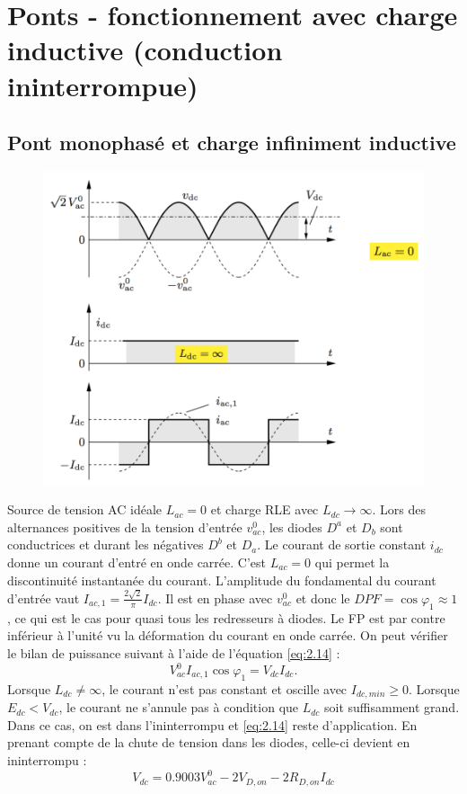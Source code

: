\section{Ponts - fonctionnement avec charge inductive (conduction ininterrompue)}
	\subsection{Pont monophasé et charge infiniment inductive}
		\begin{figure}
		\vspace{-5mm}
		\includegraphics[scale=0.3]{ch2/10}
		\end{figure} 
		Source de tension AC idéale $L_{ac} = 0$ et charge RLE avec $L_{dc}\rightarrow \infty$. Lors des alternances positives de la tension d'entrée $v_{ac}^0$, les diodes $D^a$ et $D_b$ sont conductrices et durant les négatives $D^b$ et $D_a$. Le courant de sortie constant $i_{dc}$ donne un courant d'entré en onde carrée. C'est $L_{ac} = 0$ qui permet la discontinuité instantanée du courant. L'amplitude du fondamental du courant d'entrée vaut $I_{ac,1} = \frac{2\sqrt{2}}{\pi} I_{dc}$. Il est en phase avec $v_{ac}^0$ et donc le $DPF = \cos \varphi _1 \approx 1$, ce qui est le cas pour quasi tous les redresseurs à diodes. Le FP est par contre inférieur à l'unité vu la déformation du courant en onde carrée. On peut vérifier le bilan de puissance suivant à l'aide de l'équation \eqref{eq:2.14} : 
		\begin{equation}
			V_{ac}^0I_{ac,1} \cos \varphi _1 = V_{dc} I_{dc}.
		\end{equation}
		Lorsque $L_{dc} \neq \infty$, le courant n'est pas constant et oscille avec $I_{dc,min} \geq 0$. Lorsque $E_{dc}<V_{dc}$, le courant ne s'annule pas à condition que $L_{dc}$ soit suffisamment grand. Dans ce cas, on est dans l'ininterrompu et \eqref{eq:2.14} reste d'application. En prenant compte de la chute de tension dans les diodes, celle-ci devient en ininterrompu : 
		\begin{equation}
			V_{dc} = 0.9003V_{ac}^0 - 2 V_{D,on} - 2 R_{D,on} I_{dc}
		\end{equation}
		
